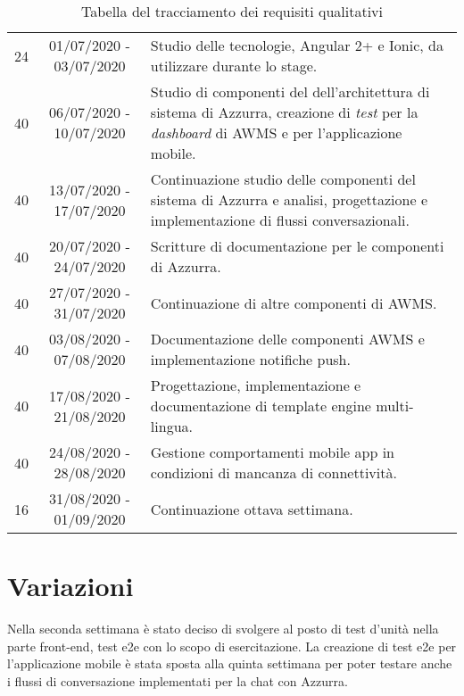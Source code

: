 \begin{table}[h]%
	\centering
\begin{tabularx}{\textwidth}{c c X}
	\hline	
	\rowcolor{giallo}
	 \intest{Durata in ore} &  \intest{Data inizio - fine} & \intest{Attività}\\	
	\hline			
	24 &  01/07/2020 - 03/07/2020 & Studio delle tecnologie, Angular 2+ e Ionic, da utilizzare durante lo stage.\\

	40 &  06/07/2020 - 10/07/2020 & Studio di componenti del dell'architettura di sistema di Azzurra, creazione di \emph{test} per la \emph{dashboard} di \gls{AWMS} e per l'applicazione mobile. \\

	40 &  13/07/2020 - 17/07/2020 & Continuazione studio delle componenti del sistema di Azzurra e analisi, progettazione e implementazione di flussi conversazionali.\\

	40 &  20/07/2020 - 24/07/2020 & Scritture di documentazione per le componenti di Azzurra.\\

	40 &  27/07/2020 - 31/07/2020 & Continuazione di altre componenti di \gls{AWMS}.\\

	40 &  03/08/2020 - 07/08/2020 & Documentazione delle componenti \gls{AWMS} e implementazione notifiche push.\\

	40 &  17/08/2020 - 21/08/2020 & Progettazione, implementazione e documentazione di template engine multi-lingua.\\

	40 &  24/08/2020 - 28/08/2020 & Gestione comportamenti mobile app in condizioni di mancanza di connettività.\\

	16 &  31/08/2020 - 01/09/2020 & Continuazione ottava settimana. \\
	\hline
\end{tabularx} \hbox{}

\caption{Tabella del tracciamento dei requisiti qualitativi}
\end{table}%

\section{Variazioni}
Nella seconda settimana è stato deciso di svolgere al posto di test d'unità nella parte front-end, \gls{test e2e}\ap{[g]} con lo scopo di esercitazione. La creazione di \gls{test e2e}\ap{[g]} per l'applicazione mobile è stata sposta alla quinta settimana per poter testare anche i flussi di conversazione implementati per la chat con Azzurra.

